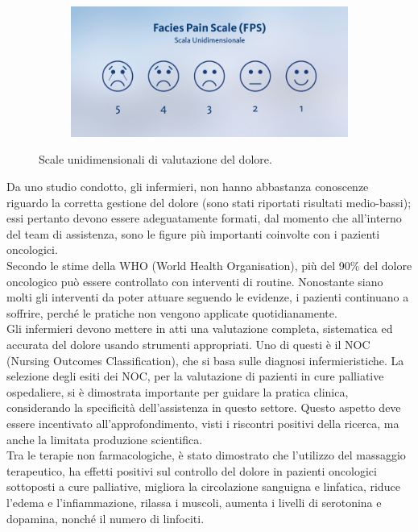 \begin{figure}[H]
\begin{subfigure}[b]{0.5\textwidth}
    
\end{subfigure}
    \begin{subfigure}[b]{0.5\textwidth}
     \includegraphics[width=\linewidth]{img/FACCINE.jpeg}
    
    
\end{subfigure}
    \caption{Scale unidimensionali di valutazione del dolore. \cite{SCALEDOLORE}}
    \label{fig:FIGURE_5.8}
    
\end{figure}

Da uno studio condotto, gli infermieri, non hanno abbastanza conoscenze riguardo la corretta gestione del dolore
(sono stati riportati risultati medio-bassi)\cite{PAIN}; essi pertanto devono essere adeguatamente formati, 
dal momento che all’interno del team di assistenza, sono le figure più importanti coinvolte con i pazienti 
oncologici.\\
Secondo le stime  della WHO (World Health Organisation), più del 90\% del dolore oncologico può essere 
controllato con interventi di routine. Nonostante siano molti gli interventi da poter attuare seguendo le evidenze, 
i pazienti continuano a soffrire, perché le pratiche non vengono applicate quotidianamente\cite{PAINONS}.\\
Gli infermieri devono mettere in atti una valutazione completa, sistematica ed accurata del dolore usando 
strumenti appropriati. Uno di questi è il NOC (Nursing Outcomes Classification), che si basa sulle diagnosi infermieristiche\cite{painNOC}. 
La selezione degli esiti dei NOC, per la valutazione di pazienti in cure palliative ospedaliere, si è dimostrata 
importante per guidare la pratica clinica, considerando la specificità dell’assistenza in questo settore\cite{painNOC}.
Questo aspetto deve essere incentivato all’approfondimento, visti i riscontri positivi della ricerca, ma anche la limitata 
produzione scientifica.\\
Tra le terapie non farmacologiche, è stato dimostrato che l’utilizzo del massaggio terapeutico, ha effetti positivi sul 
controllo del dolore in pazienti oncologici sottoposti a cure palliative, migliora la circolazione sanguigna e linfatica, 
riduce l’edema e l’infiammazione, rilassa i muscoli, aumenta i livelli di 
serotonina e dopamina, nonché il numero di linfociti\cite{tpnonfarmacologiche}.\\

